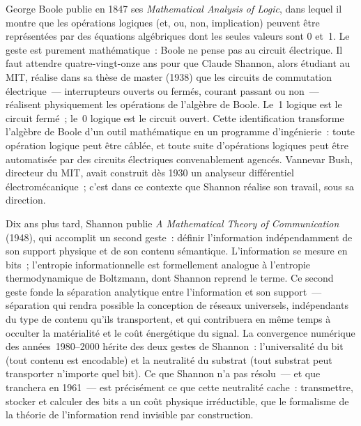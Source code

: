 %
George Boole publie en 1847 ses \emph{Mathematical Analysis of Logic}, dans lequel il montre que les opérations logiques (et, ou, non, implication) peuvent être représentées par des équations algébriques dont les seules valeurs sont 0 et~1. Le geste est purement mathématique~: Boole ne pense pas au circuit électrique. Il faut attendre quatre-vingt-onze ans pour que Claude Shannon, alors étudiant au MIT, réalise dans sa thèse de master (1938) que les circuits de commutation électrique~--- interrupteurs ouverts ou fermés, courant passant ou non~--- réalisent physiquement les opérations de l'algèbre de Boole. Le~1 logique est le circuit fermé~; le~0 logique est le circuit ouvert. Cette identification transforme l'algèbre de Boole d'un outil mathématique en un programme d'ingénierie~: toute opération logique peut être câblée, et toute suite d'opérations logiques peut être automatisée par des circuits électriques convenablement agencés. Vannevar Bush, directeur du MIT, avait construit dès 1930 un analyseur différentiel électromécanique~; c'est dans ce contexte que Shannon réalise son travail, sous sa direction.

%
Dix ans plus tard, Shannon publie \emph{A Mathematical Theory of Communication} (1948), qui accomplit un second geste~: définir l'information indépendamment de son support physique et de son contenu sémantique. L'information se mesure en bits~; l'entropie informationnelle est formellement analogue à l'entropie thermodynamique de Boltzmann, dont Shannon reprend le terme. Ce second geste fonde la séparation analytique entre l'information et son support~--- séparation qui rendra possible la conception de réseaux universels, indépendants du type de contenu qu'ils transportent, et qui contribuera en même temps à occulter la matérialité et le coût énergétique du signal. La convergence numérique des années~1980--2000 hérite des deux gestes de Shannon~: l'universalité du bit (tout contenu est encodable) et la neutralité du substrat (tout substrat peut transporter n'importe quel bit). Ce que Shannon n'a pas résolu~--- et que \textcite{landauer_irreversibility_1961} tranchera en 1961~--- est précisément ce que cette neutralité cache~: transmettre, stocker et calculer des bits a un coût physique irréductible, que le formalisme de la théorie de l'information rend invisible par construction.

